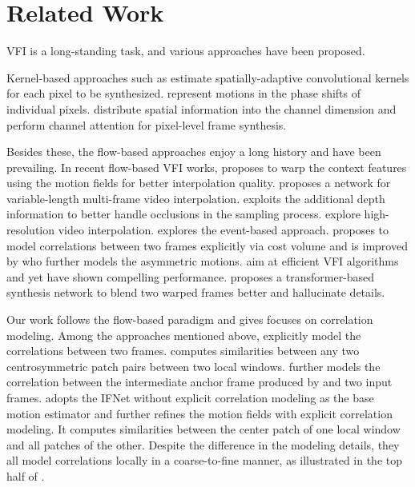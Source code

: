 \documentclass{article}
\begin{document}
\section{Related Work}

VFI is a long-standing task, and various approaches have been proposed. 

Kernel-based approaches such as \cite{ada_conv,ada_sep_conv,cheng2020video,cheng2021multiple,adacof} estimate spatially-adaptive convolutional kernels for each pixel to be synthesized. \cite{phase_based,phasenet} represent motions in the phase shifts of individual pixels. \cite{cain,dynamic_arch} distribute spatial information into the channel dimension and perform channel attention for pixel-level frame synthesis.

Besides these, the flow-based approaches enjoy a long history and have been prevailing. In recent flow-based VFI works, \cite{context_aware} proposes to warp the context features using the motion fields for better interpolation quality. \cite{superslomo} proposes a network for variable-length multi-frame video interpolation. \cite{dain} exploits the additional depth information to better handle occlusions in the sampling process. \cite{im_net,xvfi} explore high-resolution video interpolation. \cite{time_lens} explores the event-based approach. \cite{bmbc} proposes to model correlations between two frames explicitly via cost volume and is improved by \cite{abme} who further models the asymmetric motions. \cite{rife,ifrnet} aim at efficient VFI algorithms and yet have shown compelling performance. \cite{vfiformer} proposes a transformer-based synthesis network to blend two warped frames better and hallucinate details.

Our work follows the flow-based paradigm and gives focuses on correlation modeling. Among the approaches mentioned above, \cite{bmbc,abme,vfiformer} explicitly model the correlations between two frames. \cite{bmbc} computes similarities between any two centrosymmetric patch pairs between two local windows. \cite{abme} further models the correlation between the intermediate anchor frame produced by \cite{bmbc} and two input frames. \cite{vfiformer} adopts the IFNet \cite{rife} without explicit correlation modeling as the base motion estimator and further refines the motion fields with explicit correlation modeling. It computes similarities between the center patch of one local window and all patches of the other. Despite the difference in the modeling details, they all model correlations locally in a coarse-to-fine manner, as illustrated in the top half of .
\end{document}
